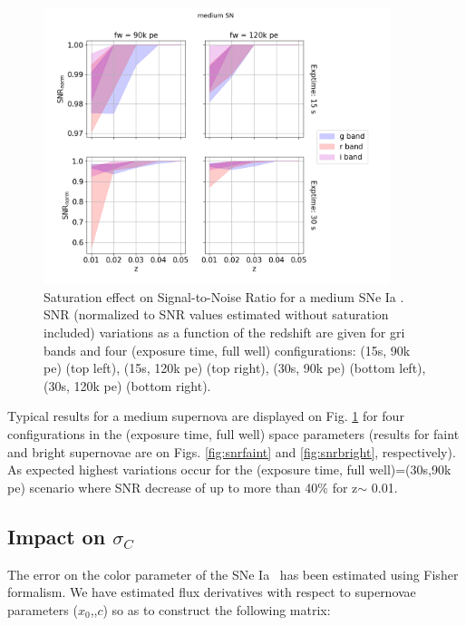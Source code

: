 \documentclass[\docopts]{\docclass}
\newcommand{\sne}{{SNe Ia }}
\newcommand{\pe}{{pe}}
\newcommand{\sncolor}{{$c$}}
\newcommand{\snx}{{$x_0$}}
\newcommand{\colorerr}{{$\sigma_C$}}
\begin{document}
\begin{figure}[htbp]
\begin{center}
  \includegraphics[width=0.9\textwidth]{SNR_medium.png}
 \caption{Saturation effect on Signal-to-Noise Ratio for a medium \sne. SNR (normalized to SNR values estimated without saturation included) variations as a function of the redshift are given for gri bands and four (exposure time, full well) configurations: (15s, 90k \pe) (top left),  (15s, 120k \pe) (top right), (30s, 90k \pe) (bottom left),  (30s, 120k \pe) (bottom right).}\label{fig:snrmedium}
\end{center}
\end{figure}

Typical results for a medium supernova are displayed on Fig. \ref{fig:snrmedium} for four configurations in the (exposure time, full well) space parameters (results for faint and bright supernovae are on Figs. \ref{fig:snrfaint} and  \ref{fig:snrbright}, respectively). As expected highest variations occur for the (exposure time, full well)=(30s,90k \pe) scenario where SNR decrease of up to more than 40\% for z$\sim$ 0.01. 

\subsection{Impact on \colorerr}

The error on the color parameter of the \sne~has been estimated using Fisher formalism. We have estimated flux derivatives with respect to supernovae parameters (\snx,\sntrectch,\sncolor) so as to construct the following matrix:
\end{document}
